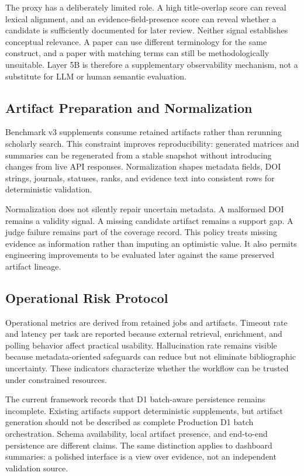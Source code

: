 \documentclass[10pt,twocolumn]{article}
\begin{document}
The proxy has a deliberately limited role. A high title-overlap score can reveal lexical alignment, and an evidence-field-presence score can reveal whether a candidate is sufficiently documented for later review. Neither signal establishes conceptual relevance. A paper can use different terminology for the same construct, and a paper with matching terms can still be methodologically unsuitable. Layer 5B is therefore a supplementary observability mechanism, not a substitute for LLM or human semantic evaluation.

\subsection{Artifact Preparation and Normalization}
Benchmark v3 supplements consume retained artifacts rather than rerunning scholarly search. This constraint improves reproducibility: generated matrices and summaries can be regenerated from a stable snapshot without introducing changes from live API responses. Normalization shapes metadata fields, DOI strings, journals, statuses, ranks, and evidence text into consistent rows for deterministic validation.

Normalization does not silently repair uncertain metadata. A malformed DOI remains a validity signal. A missing candidate artifact remains a support gap. A judge failure remains part of the coverage record. This policy treats missing evidence as information rather than imputing an optimistic value. It also permits engineering improvements to be evaluated later against the same preserved artifact lineage.

\subsection{Operational Risk Protocol}
Operational metrics are derived from retained jobs and artifacts. Timeout rate and latency per task are reported because external retrieval, enrichment, and polling behavior affect practical usability. Hallucination rate remains visible because metadata-oriented safeguards can reduce but not eliminate bibliographic uncertainty. These indicators characterize whether the workflow can be trusted under constrained resources.

The current framework records that D1 batch-aware persistence remains incomplete. Existing artifacts support deterministic supplements, but artifact generation should not be described as complete Production D1 batch orchestration. Schema availability, local artifact presence, and end-to-end persistence are different claims. The same distinction applies to dashboard summaries: a polished interface is a view over evidence, not an independent validation source.
\end{document}
